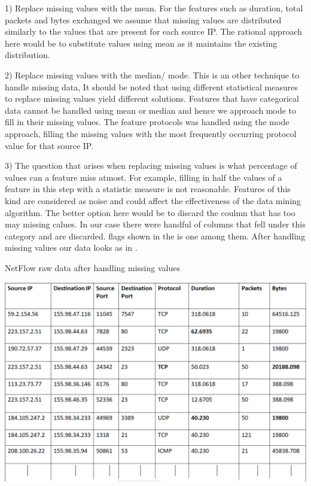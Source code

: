 1) Replace missing values with the mean. For the features such as duration, total packets and bytes exchanged we assume that missing values are distributed similarly to the values that are present for each source IP. The rational approach here would be to substitute values using mean as it maintains the existing distribution.

2) Replace missing values with the median/ mode. This is an other technique to handle missing data, It should be noted that using different statistical measures to replace missing values yield different solutions. Features that have categorical data cannot be handled using mean or median and hence we approach mode to fill in their missing values. The feature protocols was handled using the mode approach, filling the missing values with the most frequently occurring protocol value for that source IP.

3) The question that arises when replacing missing values is what percentage of values can a feature miss atmost. For example, filling in half the values of a feature in this step with a statistic measure is not reasonable. Features of this kind are considered as noise and could affect the effectiveness of the data mining algorithm. The better option here would be to discard the coulmn that has too may missing calues. In our case there were handful of columns that fell under this category and are discarded. flags shown in the  is one among them. After handling missing values our data looks as in .

\begin{table}[b]
	\caption{NetFlow raw data after handling missing values}%
	\centerline{\includegraphics[scale = 0.6]{missing_data.png}}
	
\end{table}


